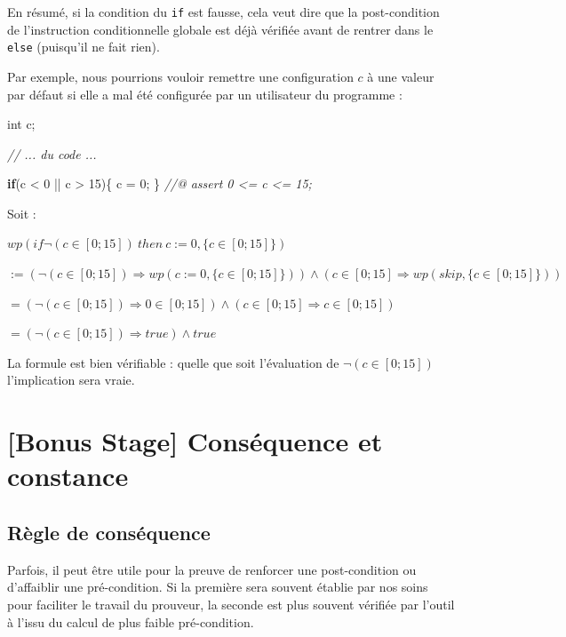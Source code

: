 \documentclass[12pt,francais,]{scrbook}
\newenvironment{Shaded}{}{}
\newcommand{\KeywordTok}[1]{\textcolor[rgb]{0.00,0.44,0.13}{\textbf{{#1}}}}
\newcommand{\DataTypeTok}[1]{\textcolor[rgb]{0.56,0.13,0.00}{{#1}}}
\newcommand{\DecValTok}[1]{\textcolor[rgb]{0.25,0.63,0.44}{{#1}}}
\newcommand{\CommentTok}[1]{\textcolor[rgb]{0.38,0.63,0.69}{\textit{{#1}}}}
\newcommand{\NormalTok}[1]{{#1}}
\begin{document}
En résumé, si la condition du \texttt{if} est fausse, cela veut dire que
la post-condition de l'instruction conditionnelle globale est déjà
vérifiée avant de rentrer dans le \texttt{else} (puisqu'il ne fait
rien).

Par exemple, nous pourrions vouloir remettre une configuration \(c\) à
une valeur par défaut si elle a mal été configurée par un utilisateur du
programme :

\begin{footnotesize}\begin{Shaded}
\begin{Highlighting}[]
\DataTypeTok{int} \NormalTok{c;}

\CommentTok{// ... du code ...}

\KeywordTok{if}\NormalTok{(c < }\DecValTok{0} \NormalTok{|| c > }\DecValTok{15}\NormalTok{)\{}
  \NormalTok{c = }\DecValTok{0}\NormalTok{;}
\NormalTok{\}}
\CommentTok{//@ assert 0 <= c <= 15;}
\end{Highlighting}
\end{Shaded}\end{footnotesize}

Soit :

\(wp(if \neg (c \in [0;15])\ then\ c := 0, \{c \in [0;15]\})\)

\(:= (\neg (c \in [0;15])\Rightarrow wp(c := 0, \{c \in [0;15]\})) \wedge (c \in [0;15]\Rightarrow wp(skip, \{c \in [0;15]\}))\)

\(= (\neg (c \in [0;15]) \Rightarrow 0 \in [0;15]) \wedge (c \in [0;15] \Rightarrow c \in [0;15])\)

\(= (\neg (c \in [0;15]) \Rightarrow true) \wedge true\)

La formule est bien vérifiable : quelle que soit l'évaluation de
\(\neg (c \in [0;15])\) l'implication sera vraie.

\section{{[}Bonus Stage{]} Conséquence et
constance}\label{bonus-stage-consuxe9quence-et-constance}

\subsection{Règle de conséquence}\label{ruxe8gle-de-consuxe9quence}

Parfois, il peut être utile pour la preuve de renforcer une
post-condition ou d'affaiblir une pré-condition. Si la première sera
souvent établie par nos soins pour faciliter le travail du prouveur, la
seconde est plus souvent vérifiée par l'outil à l'issu du calcul de plus
faible pré-condition.
\end{document}

